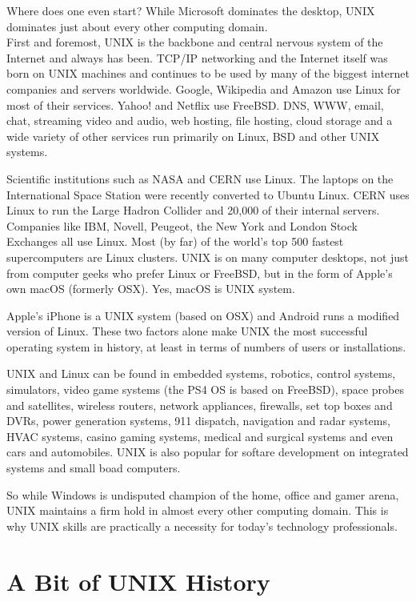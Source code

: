 Where does one even start?  While Microsoft dominates the desktop, UNIX dominates just about every other computing domain.\\

First and foremost, UNIX is the backbone and central nervous system of the Internet and always has been. TCP/IP networking and the Internet itself was born on UNIX machines and continues to be used by many of the biggest internet companies and servers worldwide.  Google, Wikipedia and Amazon use Linux for most of their services.  Yahoo! and Netflix use FreeBSD. DNS, WWW, email, chat, streaming video and audio, web hosting, file hosting, cloud storage and a wide variety of other services run primarily on Linux, BSD and other UNIX systems.

Scientific institutions such as NASA and CERN use Linux.  The laptops on the International Space Station were recently converted to Ubuntu Linux.  CERN uses Linux to run the Large Hadron Collider and 20,000 of their internal servers.  Companies like IBM, Novell, Peugeot, the New York and London Stock Exchanges all use Linux.  Most (by far) of the world's top 500 fastest supercomputers are Linux clusters.  UNIX is on many computer desktops, not just from computer geeks who prefer Linux or FreeBSD, but in the form of Apple's own macOS (formerly OSX). Yes, macOS is UNIX system.

Apple's iPhone is a UNIX system (based on OSX) and Android runs a modified version of Linux. These two factors alone make UNIX the most successful operating system in history, at least in terms of numbers of users or installations.

UNIX and Linux can be found in embedded systems, robotics, control systems, simulators, video game systems (the PS4 OS is based on FreeBSD), space probes and satellites, wireless routers, network appliances, firewalls, set top boxes and DVRs, power generation systems, 911 dispatch, navigation and radar systems, HVAC systems, casino gaming systems, medical and surgical systems and even cars and automobiles. UNIX is also popular for softare development on integrated systems and small boad computers.

So while Windows is undisputed champion of the home, office and gamer arena, UNIX maintains a firm hold in almost every other computing domain. This is why UNIX skills are practically a necessity for today's technology professionals.

\section{A Bit of UNIX History}

